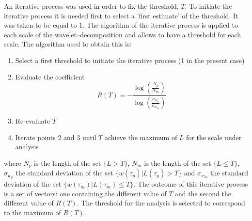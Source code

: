 An iterative process was used in order to fix the threshold, $T$. To initiate the iterative process it is needed first to select a 'first estimate' of the threshold. It was taken to be equal to 1. The algorithm of the iterative process is applied to each scale of the wavelet--decomposition and allows to have a threshold for each scale. The algorithm used to obtain this is:
\begin{enumerate}
	\item Select a first threshold to initiate the iterative process (1 in the present case)
	\item Evaluate the coefficient
	\begin{equation}
	R(T) = -\frac{\log\left(\frac{N_p}{N_m}\right)}{\log\left(\frac{\sigma_{w_p}}{\sigma_{w_m}}\right)}
	\end{equation}
	\item Re-evaluate $T$
	\item Iterate points 2 and 3 until $T$ achieve the maximum of $L$ for the scale under analysis
\end{enumerate}
where $N_p$ is the length of the set $\{L > T\}$, $N_m$ is the length of the set $\{L \leqslant T\}$, $\sigma_{w_p}$ the standard deviation of the set $\{w\left( \tau_p\right) | L\left( \tau_p \right) > T\}$ and $\sigma_{w_m}$ the standard deviation of the set $\{w\left( \tau_m\right) | L\left( \tau_m \right) \leqslant T\}$.
The outcome of this iterative process is a set of vectors: one containing the different value of $T$ and the second the different value of $R(T)$. The threshold for the analysis is selected to correspond to the maximum of $R(T)$.

